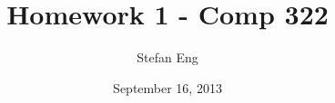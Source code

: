 \documentclass{article}
\title{Homework 1 - Comp 322}
\author{Stefan Eng}
\date{September 16, 2013}
\begin{document}

\maketitle
\doublespacing
\end{document}
